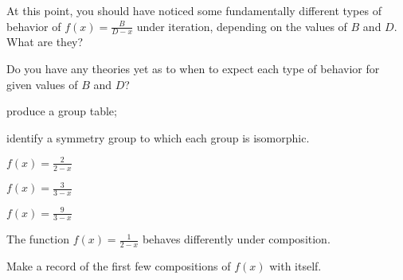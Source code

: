 \documentclass[../gatm_answers.tex]{subfiles}
\begin{document}
\begin{outer_problem}
\item
\end{outer_problem}

\begin{inner_problem}[start=1]
\item At this point, you should have noticed some fundamentally different types of behavior of $f(x)=\frac{B}{D-x}$ under iteration, depending on the values of $B$ and $D$. What are they?
\end{inner_problem}

\begin{inner_problem}
\item Do you have any theories yet as to when to expect each type of behavior for given values of $B$ and $D$?
\end{inner_problem}

\begin{outer_problem}
\item produce a group table;
\end{outer_problem}

\begin{outer_problem}
\item identify a symmetry group to which each group is isomorphic.
\end{outer_problem}

\begin{outer_problem}
\item \label{prob:compose_start}$f(x)=\frac{2}{2-x}$
\end{outer_problem}

\begin{outer_problem}
\item $f(x)=\frac{3}{3-x}$
\end{outer_problem}

\begin{outer_problem}
\item \label{prob:compose_end}$f(x)=\frac{9}{3-x}$
\end{outer_problem}

\begin{outer_problem}
\item The function $f(x)=\frac{1}{2-x}$ behaves differently under composition.
\end{outer_problem}

\begin{inner_problem}[start=1]
\item Make a record of the first few compositions of $f(x)$ with itself.
\end{inner_problem}
\end{document}
